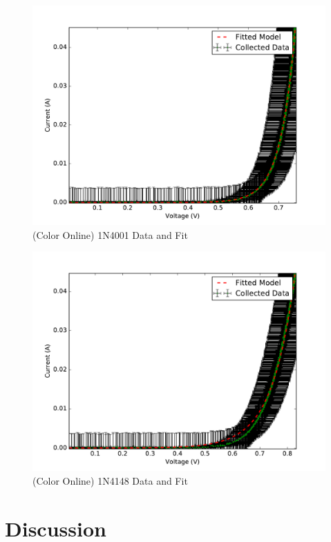 \documentclass[reprint]{revtex4-1}
\begin{document}
\begin{figure}
\includegraphics[width=\columnwidth]{../resources/plots/diode1_1n4001.pdf}
\caption{(Color Online) \textsc{1N4001} Data and Fit}
\label{fig:1N4001}
\end{figure}

\begin{figure}
\includegraphics[width=\columnwidth]{../resources/plots/diode2_1n4148.pdf}
\caption{(Color Online) \textsc{1N4148} Data and Fit}
\label{fig:1N4148}
\end{figure}

\section{Discussion}
\end{document}
